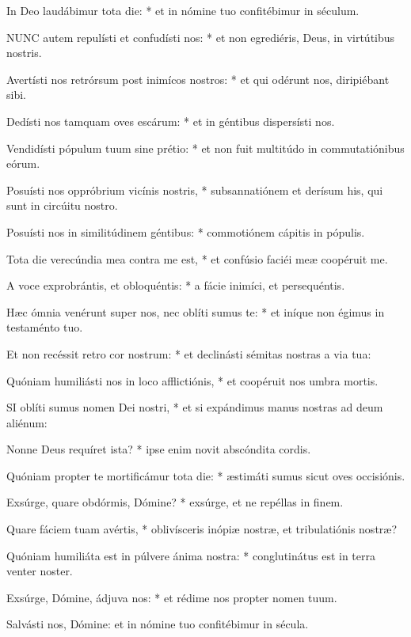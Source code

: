 In Deo laudábimur tota die: * et in nómine tuo confitébimur in séculum.


\lettrine[lines=2]{N}{UNC} autem repulísti et confudísti nos: * et non egrediéris, Deus, in virtútibus nostris.

Avertísti nos retrórsum post inimícos nostros: * et qui odérunt nos, diripiébant sibi.

Dedísti nos tamquam oves escárum: * et in géntibus dispersísti nos.

Vendidísti pópulum tuum sine prétio: * et non fuit multitúdo in commutatiónibus eórum.

Posuísti nos oppróbrium vicínis nostris, * subsannatiónem et derísum his, qui sunt in circúitu nostro.

Posuísti nos in similitúdinem géntibus: * commotiónem cápitis in pópulis.

Tota die verecúndia mea contra me est, * et confúsio faciéi meæ coopéruit me.

A voce exprobrántis, et obloquéntis: * a fácie inimíci, et persequéntis.

Hæc ómnia venérunt super nos, nec oblíti sumus te: * et iníque non égimus in testaménto tuo.

Et non recéssit retro cor nostrum: * et declinásti sémitas nostras a via tua:

Quóniam humiliásti nos in loco afflictiónis, * et coopéruit nos umbra mortis.


\lettrine[lines=2]{S}{I} oblíti sumus nomen Dei nostri, * et si expándimus manus nostras ad deum aliénum:

Nonne Deus requíret ista? * ipse enim novit abscóndita cordis.

Quóniam propter te mortificámur tota die: * æstimáti sumus sicut oves occisiónis.

Exsúrge, quare obdórmis, Dómine? * exsúrge, et ne repéllas in finem.

Quare fáciem tuam avértis, * oblivísceris inópiæ nostræ, et tribulatiónis nostræ?

Quóniam humiliáta est in púlvere ánima nostra: * conglutinátus est in terra venter noster.

Exsúrge, Dómine, ádjuva nos: * et rédime nos propter nomen tuum.

  Salvásti nos, Dómine: et in nómine tuo confitébimur in sécula.


